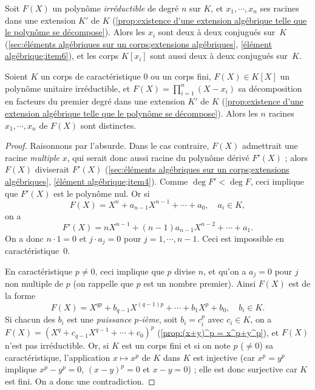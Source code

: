 \documentclass[11pt, useosf,
  title in boldface,
  theorem in new line,
  theorem numbering = section,
  number theorems separately,
]{simplivre}
\begin{document}
    \begin{example}
        Soit \( F(X) \) un polynôme \emph{irréductible} de degré \( n \) sur \( K \), et \( x_1, \cdots, x_n \) ses racines dans une extension \( K' \) de \( K \) (\cref{prop:existence d'une extension algébrique telle que le polynôme se décompose}). Alors les \( x_i \) sont deux à deux conjugués sur~\( K \) (\cref{sec:éléments algébriques sur un corps;extensions algébriques}, \ref{élément algébrique;item6}), et les corps \( K[x_i] \) sont aussi deux à deux conjugués sur~\( K \).
    \end{example}

    \begin{lemma}\label{lem:racines conjugués sont distinctes}
        Soient \( K \) un corps de caractéristique \( 0 \) ou un corps fini, \( F(X) \in K[X] \) un polynôme unitaire irréductible, et \( F(X) = \prod_{i = 1}^n (X-x_i) \) sa décomposition en facteurs du premier degré dans une extension \( K' \) de \( K \) (\cref{prop:existence d'une extension algébrique telle que le polynôme se décompose}). Alors les \( n \) racines \( x_1, \cdots, x_n \) de \( F(X) \) sont distinctes.
    \end{lemma}
    \begin{proof}
        Raisonnons par l'absurde. Dans le cas contraire, \( F(X) \) admettrait une racine \emph{multiple} \( x \), qui serait donc aussi racine du polynôme dérivé \( F'(X) \) ; alors \( F(X) \) diviserait \( F'(X) \) (\cref{sec:éléments algébriques sur un corps;extensions algébriques}, \ref{élément algébrique;item4}). Comme \( \deg F' < \deg F \), ceci implique que \( F'(X) \) est le polynôme nul. Or si
        \[
            F(X) = X^n + a_{n-1} X^{n-1} + \cdots + a_0, \quad a_i \in K,
        \]
        on a
        \[
            F'(X) = n X^{n-1} + (n-1) a_{n-1} X^{n-2} + \cdots + a_1.
        \]
        On a donc \( n \cdot 1 = 0 \) et \( j \cdot a_j = 0 \) pour \( j = 1, \cdots, n-1 \). Ceci est impossible en caractéristique~\( 0 \).

        En caractéristique \( p \neq 0 \), ceci implique que \( p \) divise \( n \), et qu'on a \( a_j = 0 \) pour \( j \) non multiple de \( p \) (on rappelle que \( p \) est un nombre premier). Ainsi \( F(X) \) est de la forme
        \[
            F(X) = X^{q p} + b_{q-1} X^{(q-1) p} + \cdots + b_1 X^p + b_0, \quad b_i \in K.
        \]
        Si chacun des \( b_i \) est une \emph{puissance \( p \)‑ième}, soit \( b_i = c_i^p \) avec \( c_i \in K \), on a \( F(X) = (X^q + c_{q-1} X^{q-1} + \cdots + c_0)^p \) (\cref{prop:(x+y)^p = x^p+y^p}), et \( F(X) \) n'est pas irréductible. Or, si \( K \) est un corps fini et si on note \( p \) (\( \neq 0 \)) sa caractéristique, l'application \( x \mapsto x^p \) de \( K \) dans \( K \) est injective (car \( x^p = y^p \) implique \( x^p - y^p = 0 \), \( (x-y)^p = 0 \) et \( x-y = 0 \)) ; elle est donc surjective car \( K \) est fini. On a donc une contradiction.
    \end{proof}
\end{document}
